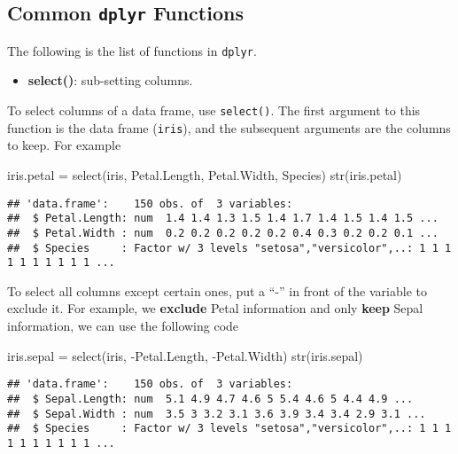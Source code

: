 \documentclass[
]{article}
\newenvironment{Shaded}{\begin{snugshade}}{\end{snugshade}}
\newcommand{\FunctionTok}[1]{\textcolor[rgb]{0.00,0.00,0.00}{#1}}
\newcommand{\NormalTok}[1]{#1}
\newcommand{\OtherTok}[1]{\textcolor[rgb]{0.56,0.35,0.01}{#1}}
\newcommand{\SpecialCharTok}[1]{\textcolor[rgb]{0.00,0.00,0.00}{#1}}
\providecommand{\tightlist}{%
  \setlength{\itemsep}{0pt}\setlength{\parskip}{0pt}}
\begin{document}
\hypertarget{common-dplyr-functions}{%
\subsection{\texorpdfstring{Common \texttt{dplyr}
Functions}{Common dplyr Functions}}\label{common-dplyr-functions}}

The following is the list of functions in \texttt{dplyr}.

\begin{itemize}
\tightlist
\item
  \textbf{select()}: sub-setting columns.
\end{itemize}

To select columns of a data frame, use \texttt{select()}. The first
argument to this function is the data frame (\texttt{iris}), and the
subsequent arguments are the columns to keep. For example

\begin{Shaded}
\begin{Highlighting}[]
\NormalTok{iris.petal }\OtherTok{=} \FunctionTok{select}\NormalTok{(iris, Petal.Length, Petal.Width, Species)}
\FunctionTok{str}\NormalTok{(iris.petal)}
\end{Highlighting}
\end{Shaded}

\begin{verbatim}
## 'data.frame':    150 obs. of  3 variables:
##  $ Petal.Length: num  1.4 1.4 1.3 1.5 1.4 1.7 1.4 1.5 1.4 1.5 ...
##  $ Petal.Width : num  0.2 0.2 0.2 0.2 0.2 0.4 0.3 0.2 0.2 0.1 ...
##  $ Species     : Factor w/ 3 levels "setosa","versicolor",..: 1 1 1 1 1 1 1 1 1 1 ...
\end{verbatim}

To select all columns except certain ones, put a ``-'' in front of the
variable to exclude it. For example, we \textbf{exclude} Petal
information and only \textbf{keep} Sepal information, we can use the
following code

\begin{Shaded}
\begin{Highlighting}[]
\NormalTok{iris.sepal }\OtherTok{=} \FunctionTok{select}\NormalTok{(iris, }\SpecialCharTok{{-}}\NormalTok{Petal.Length, }\SpecialCharTok{{-}}\NormalTok{Petal.Width)}
\FunctionTok{str}\NormalTok{(iris.sepal)}
\end{Highlighting}
\end{Shaded}

\begin{verbatim}
## 'data.frame':    150 obs. of  3 variables:
##  $ Sepal.Length: num  5.1 4.9 4.7 4.6 5 5.4 4.6 5 4.4 4.9 ...
##  $ Sepal.Width : num  3.5 3 3.2 3.1 3.6 3.9 3.4 3.4 2.9 3.1 ...
##  $ Species     : Factor w/ 3 levels "setosa","versicolor",..: 1 1 1 1 1 1 1 1 1 1 ...
\end{verbatim}
\end{document}
